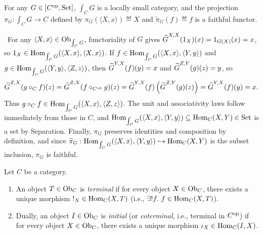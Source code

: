 \documentclass[10pt,a4paper]{article}
\begin{document}
\begin{lemma}\label{lem:cat_of_elements}
For any $G \in [C^{\textrm{op}}, {\textrm{Set}}]$, $\int_C G$ is a locally small category, and the projection $\pi_G : \int_C G \to C$ defined by $\pi_G(\langle X, x \rangle) \eqdef X$ and $\widetilde{\pi}_G(f) \eqdef f$ is a faithful functor.
\end{lemma}
\myprf\ For any $\langle X, x \rangle \in {\textrm{Ob}}_{\int_C G}$, functoriality of $G$ gives ${\widetilde{G}\textrm{}}^{X,X}(1_X)(x) = 1_{G(X)}(x) = x$, so $1_X \in {\textrm{Hom}}_{\int_C G}(\langle X, x \rangle, \langle X, x \rangle)$. If $f \in {\textrm{Hom}}_{\int_C G}(\langle X, x \rangle, \langle Y, y \rangle)$ and $g \in {\textrm{Hom}}_{\int_C G}(\langle Y, y \rangle, \langle Z, z \rangle)$, then ${\widetilde{G}\textrm{}}^{Y,X}(f)(y) = x$ and ${\widetilde{G}\textrm{}}^{Z,Y}(g)(z) = y$, so
$${\widetilde{G}\textrm{}}^{Z,X}(g \circ_C f)(z) = {\widetilde{G}\textrm{}}^{Z,X}(f \circ_{C^{\textrm{op}}} g)(z) = {\widetilde{G}\textrm{}}^{Y,X}(f)\left({\widetilde{G}\textrm{}}^{Z,Y}(g)(z)\right) = {\widetilde{G}\textrm{}}^{Y,X}(f)(y) = x.$$
Thus $g \circ_C f \in {\textrm{Hom}}_{\int_C G}(\langle X, x \rangle, \langle Z, z \rangle)$. The unit and associativity laws follow immediately from those in $C$, and ${\textrm{Hom}}_{\int_C G}(\langle X,x \rangle, \langle Y,y \rangle) \subseteq {\textrm{Hom}}_C(X,Y) \in {\textrm{Set}}$ is a set by Separation. Finally, $\pi_G$ preserves identities and composition by definition, and since $\widetilde{\pi}_G : {\textrm{Hom}}_{\int_C G}(\langle X,x \rangle, \langle Y,y \rangle) \hookrightarrow {\textrm{Hom}}_C(X,Y)$ is the subset inclusion, $\pi_G$ is faithful. \myqed

\begin{definition}\label{def:term_init}
Let $C$ be a category.
\begin{enumerate}
\item An object $T \in {\textrm{Ob}}_C$ is \emph{terminal} if for every object $X \in {\textrm{Ob}}_C$, there exists a unique morphism $!_X \in {\textrm{Hom}}_C(X, T)$ (i.e., $\exists !f.\ f \in {\textrm{Hom}}_C(X, T)$).
\item Dually, an object $I \in {\textrm{Ob}}_C$ is \emph{initial} (or \emph{coterminal}, i.e., terminal in $C^{\textrm{op}}$) if for every object $X \in {\textrm{Ob}}_C$, there exists a unique morphism $\iota_X \in {\textrm{Hom}}_C(I, X)$.
\end{enumerate}
\end{definition}
\end{document}
